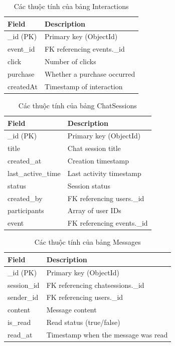 \begin{table}[H]
\centering
\begin{tabular}{|p{4.5cm}|p{6cm}|}
\hline
\textbf{Field} & \textbf{Description} \\ \hline
\_id (PK) & Primary key (ObjectId) \\ \hline
event\_id & FK referencing events.\_id \\ \hline
click & Number of clicks \\ \hline
purchase & Whether a purchase occurred \\ \hline
createdAt & Timestamp of interaction \\ \hline
\end{tabular}
\vspace{15pt}
\caption{Các thuộc tính của bảng Interactions}
\end{table}

\begin{table}[H]
\centering
\begin{tabular}{|p{4.5cm}|p{6cm}|}
\hline
\textbf{Field} & \textbf{Description} \\ \hline
\_id (PK) & Primary key (ObjectId) \\ \hline
title & Chat session title \\ \hline
created\_at & Creation timestamp \\ \hline
last\_active\_time & Last activity timestamp \\ \hline
status & Session status \\ \hline
created\_by & FK referencing users.\_id \\ \hline
participants & Array of user IDs \\ \hline
event & FK referencing events.\_id \\ \hline
\end{tabular}
\vspace{15pt}
\caption{Các thuộc tính của bảng ChatSessions}
\end{table}


\begin{table}[H]
\centering
\begin{tabular}{|p{4.5cm}|p{6cm}|}
\hline
\textbf{Field} & \textbf{Description} \\ \hline
\_id (PK) & Primary key (ObjectId) \\ \hline
session\_id & FK referencing chatsessions.\_id \\ \hline
sender\_id & FK referencing users.\_id \\ \hline
content & Message content \\ \hline
is\_read & Read status (true/false) \\ \hline
read\_at & Timestamp when the message was read \\ \hline
\end{tabular}
\vspace{15pt}
\caption{Các thuộc tính của bảng Messages}
\end{table}


